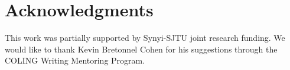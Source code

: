 \section*{Acknowledgments}

This work was partially supported by Synyi-SJTU joint research funding. 
We would like to thank Kevin Bretonnel Cohen for his suggestions through 
the COLING Writing Mentoring Program.

